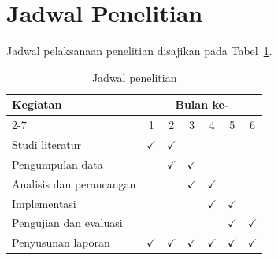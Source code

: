 \iflaporan\else
\section{Jadwal Penelitian}
\label{sec:jadwal}

Jadwal pelaksanaan penelitian disajikan pada Tabel~\ref{tab:jadwal}.

\begin{table}[htbp]
\caption{Jadwal penelitian}
\label{tab:jadwal}
\begin{tabular}{|l|*{6}{c|}}
\hline
\multirow{2}{*}{Kegiatan} & \multicolumn{6}{c|}{Bulan ke-}\\
\cline{2-7}
 & 1 & 2 & 3 & 4 & 5 & 6\\
\hline
Studi literatur            & $\checkmark$ & $\checkmark$ &  &  &  & \\
\hline
Pengumpulan data           &  & $\checkmark$ & $\checkmark$ &  &  & \\
\hline
Analisis dan perancangan   &  &  & $\checkmark$ & $\checkmark$ &  & \\
\hline
Implementasi               &  &  &  & $\checkmark$ & $\checkmark$ & \\
\hline
Pengujian dan evaluasi     &  &  &  &  & $\checkmark$ & $\checkmark$\\
\hline
Penyusunan laporan         & $\checkmark$ & $\checkmark$ & $\checkmark$ & $\checkmark$ & $\checkmark$ & $\checkmark$\\
\hline
\end{tabular}
\end{table}
\fi

